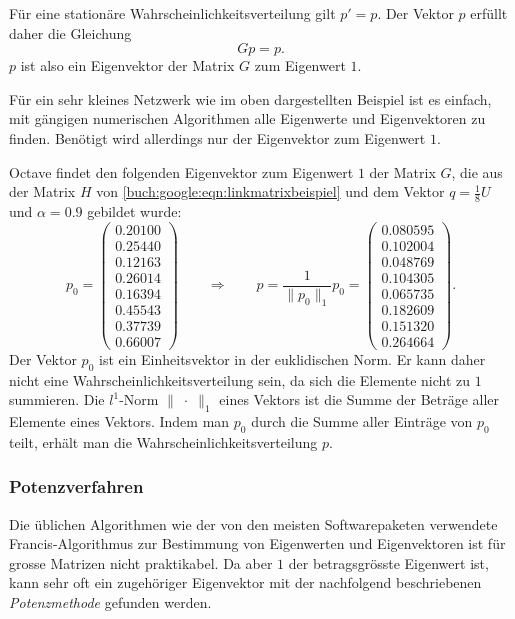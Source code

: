 Für eine stationäre Wahrscheinlichkeitsverteilung gilt $p'=p$.
Der Vektor $p$ erfüllt daher die Gleichung
\begin{equation}
Gp = p.
\label{buch:google:ewgleichung}
\end{equation}
$p$ ist also ein Eigenvektor der Matrix $G$ zum Eigenwert $1$.

Für ein sehr kleines Netzwerk wie im oben dargestellten Beispiel ist es
einfach, mit gängigen numerischen Algorithmen alle Eigenwerte und
Eigenvektoren zu finden.
Benötigt wird allerdings nur der Eigenvektor zum Eigenwert $1$.

\begin{beispiel}
Octave
findet den folgenden Eigenvektor zum Eigenwert $1$ der Matrix $G$,
die aus der Matrix $H$
von \eqref{buch:google:eqn:linkmatrixbeispiel}
und dem Vektor $q=\frac18U$ und $\alpha=0.9$ gebildet wurde:
\[
p_0=\begin{pmatrix}
   0.20100\\
   0.25440\\
   0.12163\\
   0.26014\\
   0.16394\\
   0.45543\\
   0.37739\\
   0.66007
\end{pmatrix}
\qquad\Rightarrow\qquad
p
=
\frac{1}{\|p_0\|_1}p_0
=
\begin{pmatrix}
   0.080595\\
   0.102004\\
   0.048769\\
   0.104305\\
   0.065735\\
   0.182609\\
   0.151320\\
   0.264664
\end{pmatrix}.
\]
Der Vektor $p_0$ ist ein Einheitsvektor in der euklidischen Norm.
Er kann daher nicht eine Wahrscheinlichkeitsverteilung sein,
da sich die Elemente nicht zu $1$ summieren.
Die $l^1$-Norm $\|\;\cdot\;\|_1$ eines Vektors ist die Summe der Beträge aller
Elemente eines Vektors.
Indem man $p_0$ durch die Summe aller Einträge von $p_0$ teilt,
erhält man die Wahrscheinlichkeitsverteilung $p$.
\end{beispiel}


\subsubsection{Potenzverfahren}
Die üblichen Algorithmen wie der von den meisten Softwarepaketen
verwendete Francis-Algorithmus \cite{francis:watkins_paper,buch:watkins}
%
zur Bestimmung von Eigenwerten
und Eigenvektoren ist für grosse Matrizen nicht praktikabel.
Da aber $1$ der betragsgrösste Eigenwert ist, kann sehr oft ein zugehöriger
Eigenvektor mit der nachfolgend beschriebenen {\em Potenzmethode}
%
gefunden werden.

